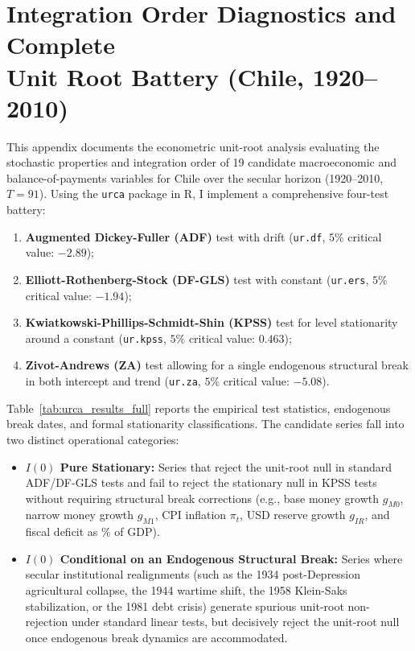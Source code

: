 \section[Integration Order Diagnostics and Unit Root Battery]{Integration Order Diagnostics and Complete\\Unit Root Battery (Chile, 1920--2010)}
\label{app:unit_root_battery}

This appendix documents the econometric unit-root analysis evaluating the stochastic properties and integration order of 19 candidate macroeconomic and balance-of-payments variables for Chile over the secular horizon (1920--2010, $T=91$). Using the \texttt{urca} package in \textsf{R}, I implement a comprehensive four-test battery:
\begin{enumerate}[leftmargin=2em]
	\item \textbf{Augmented Dickey-Fuller (ADF)} test with drift (\texttt{ur.df}, $5\%$ critical value: $-2.89$);
	\item \textbf{Elliott-Rothenberg-Stock (DF-GLS)} test with constant (\texttt{ur.ers}, $5\%$ critical value: $-1.94$);
	\item \textbf{Kwiatkowski-Phillips-Schmidt-Shin (KPSS)} test for level stationarity around a constant (\texttt{ur.kpss}, $5\%$ critical value: $0.463$);
	\item \textbf{Zivot-Andrews (ZA)} test allowing for a single endogenous structural break in both intercept and trend (\texttt{ur.za}, $5\%$ critical value: $-5.08$).
\end{enumerate}

Table~\ref{tab:urca_results_full} reports the empirical test statistics, endogenous break dates, and formal stationarity classifications. The candidate series fall into two distinct operational categories:
\begin{itemize}[leftmargin=2em]
	\item \textbf{$I(0)$ Pure Stationary:} Series that reject the unit-root null in standard ADF/DF-GLS tests and fail to reject the stationary null in KPSS tests without requiring structural break corrections (e.g., base money growth $g_{M0}$, narrow money growth $g_{M1}$, CPI inflation $\pi_t$, USD reserve growth $g_{IR}$, and fiscal deficit as \% of GDP).
	\item \textbf{$I(0)$ Conditional on an Endogenous Structural Break:} Series where secular institutional realignments (such as the 1934 post-Depression agricultural collapse, the 1944 wartime shift, the 1958 Klein-Saks stabilization, or the 1981 debt crisis) generate spurious unit-root non-rejection under standard linear tests, but decisively reject the unit-root null once endogenous break dynamics are accommodated.
\end{itemize}

